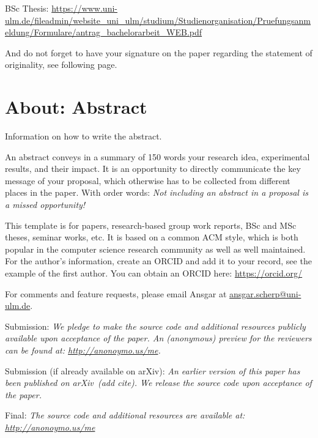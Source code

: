 \documentclass[manuscript, nonacm]{acmart}
\begin{document}
BSc Thesis:
\url{https://www.uni-ulm.de/fileadmin/website_uni_ulm/studium/Studienorganisation/Pruefungsanmeldung/Formulare/antrag_bachelorarbeit_WEB.pdf}

And do not forget to have your signature on the paper regarding the statement of originality, see following page.



\section{About: Abstract }

Information on how to write the abstract.

\begin{tcolorbox}[title=Abstract: How to write it]
An abstract conveys in a summary of 150 words your research idea, experimental results, and their impact. It is an opportunity to directly communicate the key message of your proposal, which otherwise has to be collected from different places in the paper. With order words: \textit{Not including an abstract in a proposal is a missed opportunity!}
\end{tcolorbox}

This template is for papers, research-based group work reports, BSc and MSc theses, seminar works, etc. 
It is based on a common ACM style, which is both popular in the computer science research community as well as well maintained.
%
For the author's information, create an ORCID and add it to your record, see the example of the first author.
You can obtain an ORCID here: \url{https://orcid.org/}


For comments and feature requests, please email Ansgar at
\href{mailto:ansgar.scherp@uni-ulm.de?subject=DSBDA-TemplateForPaper-Annotated}{ansgar.scherp@uni-ulm.de}.


Submission: \textit{We pledge to make the source code and additional resources publicly available upon acceptance of the paper.
An (anonymous) preview for the reviewers can be found at:
\url{http://anonoymo.us/me}.}

Submission (if already available on arXiv): \textit{An earlier version of this paper has been published on arXiv~(add cite). %
We release the source code upon acceptance of the paper.}

Final: \textit{The source code and additional resources are available at: \url{http://anonoymo.us/me}}
\end{document}

